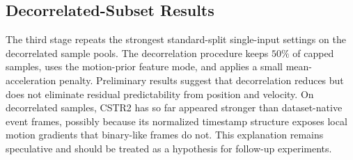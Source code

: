 \begin{table}[t]
  \centering
  \caption{Standard-split forecasting results before decorrelation. Lower is better for ADE/FDE; higher is better for mIoU.}
  \label{tab:standard-results}
\end{table}

\subsection{Decorrelated-Subset Results}

The third stage repeats the strongest standard-split single-input settings on the decorrelated sample pools. The decorrelation procedure keeps $50\%$ of capped samples, uses the motion-prior feature mode, and applies a small mean-acceleration penalty. Preliminary results suggest that decorrelation reduces but does not eliminate residual predictability from position and velocity. On decorrelated samples, CSTR2 has so far appeared stronger than dataset-native event frames, possibly because its normalized timestamp structure exposes local motion gradients that binary-like frames do not. This explanation remains speculative and should be treated as a hypothesis for follow-up experiments.

